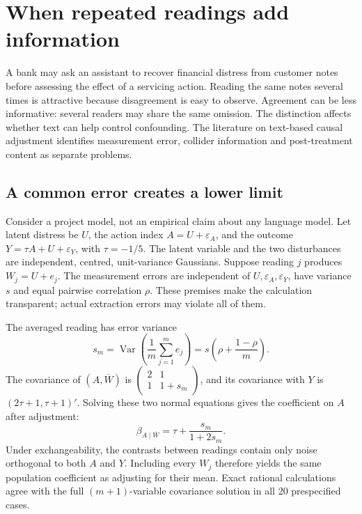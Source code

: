 \chapter{When repeated readings add information}
\label{gap29:measurement}

A bank may ask an assistant to recover financial distress from customer
notes before assessing the effect of a servicing action. Reading the same
notes several times is attractive because disagreement is easy to observe.
Agreement can be less informative: several readers may share the same
omission. The distinction affects whether text can help control confounding.
The literature on text-based causal adjustment identifies measurement error,
collider information and post-treatment content as separate problems.
\citep{exec13_census_text_review_arxiv}

\section{A common error creates a lower limit}
Consider a project model, not an empirical claim about any language model.
Let latent distress be $U$, the action index $A=U+\varepsilon_A$, and
the outcome $Y=\tau A+U+\varepsilon_Y$, with $\tau=-1/5$. The latent
variable and the two disturbances are independent, centred, unit-variance
Gaussians. Suppose reading $j$ produces $W_j=U+e_j$. The measurement errors
are independent of $U,\varepsilon_A,\varepsilon_Y$, have variance $s$ and
equal pairwise correlation $\rho$. These premises make the calculation
transparent; actual extraction errors may violate all of them.

The averaged reading has error variance
\[
 s_m=\operatorname{Var}\!\left(\frac{1}{m}\sum_{j=1}^m e_j\right)
     =s\left(\rho+\frac{1-\rho}{m}\right).
\]
The covariance of $(A,\overline W)$ is
$\left(\begin{smallmatrix}2&1\\1&1+s_m\end{smallmatrix}\right)$,
and its covariance with $Y$ is $(2\tau+1,\tau+1)'$. Solving these two
normal equations gives the coefficient on $A$ after adjustment:
\[
 \beta_{A\mid\overline W}=\tau+\frac{s_m}{1+2s_m}.
\]
Under exchangeability, the contrasts between readings contain only noise
orthogonal to both $A$ and $Y$. Including every $W_j$ therefore yields the
same population coefficient as adjusting for their mean. Exact rational
calculations agree with the full $(m+1)$-variable covariance solution in all
20 prespecified cases.

